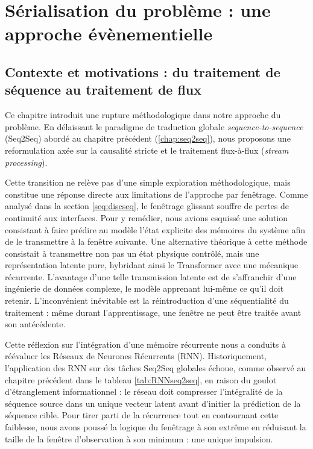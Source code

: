 \chapter{Sérialisation du problème : une approche évènementielle}
\section{Contexte et motivations : du traitement de séquence au traitement de flux}

Ce chapitre introduit une rupture méthodologique dans notre approche du problème. En délaissant le paradigme de traduction globale \textit{sequence-to-sequence} (Seq2Seq) abordé au chapitre précédent (\ref{chap:seq2seq}), nous proposons une reformulation axée sur la causalité stricte et le traitement flux-à-flux (\textit{stream processing}).

Cette transition ne relève pas d'une simple exploration méthodologique, mais constitue une réponse directe aux limitations de l'approche par fenêtrage. Comme analysé dans la section \ref{seq:discseq}, le fenêtrage glissant souffre de pertes de continuité aux interfaces. Pour y remédier, nous avions esquissé une solution consistant à faire prédire au modèle l'état explicite des mémoires du système afin de le transmettre à la fenêtre suivante. Une alternative théorique à cette méthode consistait à transmettre non pas un état physique contrôlé, mais une représentation latente pure, hybridant ainsi le Transformer avec une mécanique récurrente. L'avantage d'une telle transmission latente est de s'affranchir d'une ingénierie de données complexe, le modèle apprenant lui-même ce qu'il doit retenir. L'inconvénient inévitable est la réintroduction d'une séquentialité  du traitement : même durant l'apprentissage, une fenêtre ne peut être traitée avant son antécédente.

Cette réflexion sur l'intégration d'une mémoire récurrente nous a conduits à réévaluer les Réseaux de Neurones Récurrents (RNN). Historiquement, l'application des RNN sur des tâches Seq2Seq globales échoue, comme observé au chapitre précédent dans le tableau \ref{tab:RNNseq2seq}, en raison du goulot d'étranglement informationnel : le réseau doit compresser l'intégralité de la séquence source dans un unique vecteur latent avant d'initier la prédiction de la séquence cible. Pour tirer parti de la récurrence tout en contournant cette faiblesse, nous avons poussé la logique du fenêtrage à son extrême en réduisant la taille de la fenêtre d'observation à son minimum : une unique impulsion.

